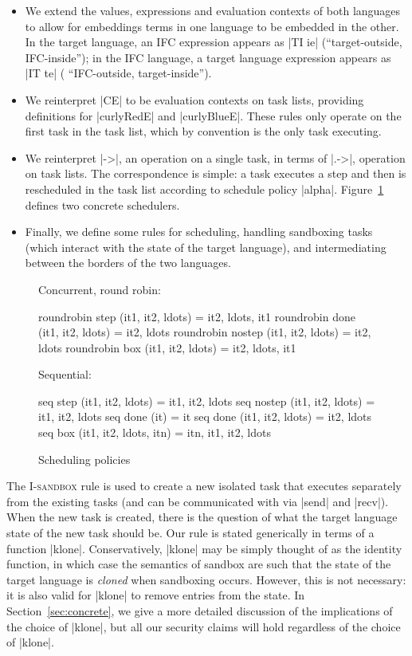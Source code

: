 \begin{itemize}
    \item We extend the values, expressions and evaluation contexts of both languages to allow for embeddings terms in one language to be embedded in the other.~\cite{Matthews:2007:OSM:1190216.1190220}
In the target language, an IFC expression appears as |TI ie| (``target-outside,
IFC-inside''); in the IFC language, a target language expression appears as |IT
te| ( ``IFC-outside, target-inside'').
    \item We reinterpret |CE| to be evaluation contexts on task lists, providing definitions for |curlyRedE| and |curlyBlueE|.  These rules only operate on the first task in the task list, which by convention is the only task executing.
    \item We reinterpret |->|, an operation on a single task, in terms of |.->|, operation on task lists.  The correspondence is simple: a task executes a step and then is rescheduled in the task list according to schedule policy |alpha|.
    Figure~\ref{fig:scheduler} defines two concrete schedulers.
    \item Finally, we define some rules for scheduling, handling sandboxing tasks (which interact with the state of the target language),
    and intermediating between the borders of the two languages.
\end{itemize}

\begin{figure}
  Concurrent, round robin:
\begin{code}
  roundrobin step (it1, it2, ldots)  = it2, ldots, it1
  roundrobin done (it1, it2, ldots)     = it2, ldots
  roundrobin nostep (it1, it2, ldots)     = it2, ldots
  roundrobin box (it1, it2, ldots)     = it2, ldots, it1
\end{code}
  Sequential:
\begin{code}
  seq step (it1, it2, ldots)     = it1, it2, ldots
  seq nostep (it1, it2, ldots)        = it1, it2, ldots
  seq done (it)                     = it
  seq done (it1, it2, ldots)        = it2, ldots
  seq box (it1, it2, ldots, itn)   = itn, it1, it2, ldots
\end{code}
\caption{Scheduling policies}
\label{fig:scheduler}
\end{figure}

The \textsc{I-sandbox} rule is used to create a new isolated task that
executes separately from the existing tasks (and can be communicated
with via |send| and |recv|).  When the new task is created, there
is the question of what the target language state of the new task should
be.  Our rule is stated generically in terms of a function |klone|.
Conservatively, |klone| may be simply thought of as the identity
function, in which
case the semantics of sandbox are such that the state of the target language is \emph{cloned}
when sandboxing occurs.  However, this is not necessary: it is also valid for |klone|
to remove entries from the state.  In Section~\ref{sec:concrete}, we give a more detailed
discussion of the implications of the choice of |klone|, but all our
security claims will hold regardless of the choice of |klone|.

